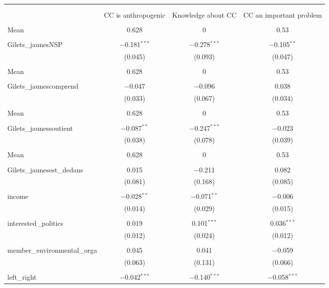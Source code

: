 
\begin{tabular}{@{\extracolsep{5pt}}lccc} 
\\[-1.8ex]\hline 
\hline \\[-1.8ex] 
\\[-1.8ex] & CC is anthropogenic & Knowledge about CC & CC an important problem \\ 
\hline \\[-1.8ex] 
 Mean & 0.628 & 0 & 0.53  \\ \hline \\[-1.8ex] Gilets\_jaunesNSP & $-$0.181$^{***}$ & $-$0.278$^{***}$ & $-$0.105$^{**}$ \\ 
  & (0.045) & (0.093) & (0.047) \\ 
  & & & \\ 
 Mean & 0.628 & 0 & 0.53  \\ \hline \\[-1.8ex] Gilets\_jaunescomprend & $-$0.047 & $-$0.096 & 0.038 \\ 
  & (0.033) & (0.067) & (0.034) \\ 
  & & & \\ 
 Mean & 0.628 & 0 & 0.53  \\ \hline \\[-1.8ex] Gilets\_jaunessoutient & $-$0.087$^{**}$ & $-$0.247$^{***}$ & $-$0.023 \\ 
  & (0.038) & (0.078) & (0.039) \\ 
  & & & \\ 
 Mean & 0.628 & 0 & 0.53  \\ \hline \\[-1.8ex] Gilets\_jaunesest\_dedans & 0.015 & $-$0.211 & 0.082 \\ 
  & (0.081) & (0.168) & (0.085) \\ 
  & & & \\ 
 income & $-$0.028$^{**}$ & $-$0.071$^{**}$ & $-$0.006 \\ 
  & (0.014) & (0.029) & (0.015) \\ 
  & & & \\ 
 interested\_politics & 0.019 & 0.101$^{***}$ & 0.036$^{***}$ \\ 
  & (0.012) & (0.024) & (0.012) \\ 
  & & & \\ 
 member\_environmental\_orga & 0.045 & 0.041 & $-$0.059 \\ 
  & (0.063) & (0.131) & (0.066) \\ 
  & & & \\ 
 left\_right & $-$0.042$^{***}$ & $-$0.140$^{***}$ & $-$0.058$^{***}$ \\ 

\end{tabular}

